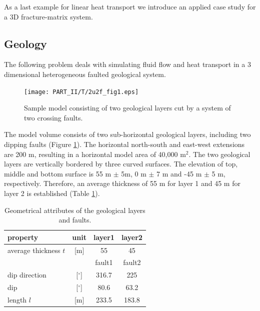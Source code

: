 As a last example for linear heat transport we introduce an applied case study for a 3D fracture-matrix system.

\subsection{Geology}

The following problem deals with simulating fluid flow and heat transport in a 3 dimensional heterogeneous faulted geological system.  
\label{sec:model}
\begin{figure}[htbp]
    \begin{center}
        \texttt{[image: PART\_II/T/2u2f\_fig1.eps]}
        \caption{Sample model consisting of two geological layers cut by a system of two crossing faults.}
        \label{fig1}
    \end{center}
\end{figure}

The model volume consists of two sub-horizontal geological layers, including two dipping faults (Figure \ref{fig1}). The horizontal north-south and east-west extensions are 200 m, resulting in a horizontal model area of 40,000 m$^{2}$. The two geological layers are vertically bordered by three curved surfaces. The elevation of top, middle and bottom surface is 55 m $\pm{}$ 5m, 0 m $\pm{}$ 7 m and -45 m $\pm{}$ 5 m, respectively.  Therefore, an average thickness of 55 m for layer 1 and 45 m for layer 2 is established (Table \ref{tab:geometry}).

\begin{table}[htbp]
    \begin{center}
        \caption{Geometrical attributes of the geological layers and faults.}
        \begin{tabular}{lccc}
          \hline
          property & unit & layer1 & layer2\\
          \hline
          \hline
          average thickness $t$ & [m] & 55 & 45\\
          \hline
                   &      & fault1 & fault2\\
          \hline
          \hline
          dip direction & [$^\circ$] & 316.7 & 225\\
          dip & [$^\circ$] & 80.6 & 63.2\\
          length $l$ & [m] & 233.5 & 183.8\\
          \hline        
        \end{tabular}
        \label{tab:geometry}
    \end{center}
\end{table}

